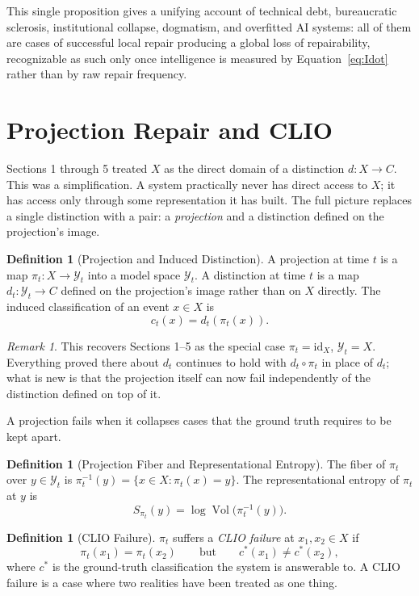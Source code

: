 \documentclass[11pt]{article}
\theoremstyle{plain}
\theoremstyle{definition}
\newtheorem{definition}[theorem]{Definition}
\theoremstyle{remark}
\newtheorem{remark}[theorem]{Remark}
\begin{document}
This single proposition gives a unifying account of technical debt, bureaucratic sclerosis, institutional collapse, dogmatism, and overfitted AI systems: all of them are cases of successful local repair producing a global loss of repairability, recognizable as such only once intelligence is measured by Equation~\eqref{eq:Idot} rather than by raw repair frequency.

\section{Projection Repair and CLIO}
\label{sec:clio}

Sections 1 through 5 treated $X$ as the direct domain of a distinction $d : X \to C$. This was a simplification. A system practically never has direct access to $X$; it has access only through some representation it has built. The full picture replaces a single distinction with a pair: a \emph{projection} and a distinction defined on the projection's image.

\begin{definition}[Projection and Induced Distinction]
A projection at time $t$ is a map $\pi_t : X \to \mathcal{Y}_t$ into a model space $\mathcal{Y}_t$. A distinction at time $t$ is a map $d_t : \mathcal{Y}_t \to C$ defined on the projection's image rather than on $X$ directly. The induced classification of an event $x \in X$ is
\[
c_t(x) = d_t(\pi_t(x)).
\]
\end{definition}

\begin{remark}
This recovers Sections 1--5 as the special case $\pi_t = \mathrm{id}_X$, $\mathcal{Y}_t = X$. Everything proved there about $d_t$ continues to hold with $d_t \circ \pi_t$ in place of $d_t$; what is new is that the projection itself can now fail independently of the distinction defined on top of it.
\end{remark}

A projection fails when it collapses cases that the ground truth requires to be kept apart.

\begin{definition}[Projection Fiber and Representational Entropy]
The fiber of $\pi_t$ over $y \in \mathcal{Y}_t$ is $\pi_t^{-1}(y) = \{x \in X : \pi_t(x) = y\}$. The representational entropy of $\pi_t$ at $y$ is
\[
S_{\pi_t}(y) = \log \operatorname{Vol}\big(\pi_t^{-1}(y)\big).
\]
\end{definition}

\begin{definition}[CLIO Failure]
$\pi_t$ suffers a \emph{CLIO failure} at $x_1, x_2 \in X$ if
\[
\pi_t(x_1) = \pi_t(x_2) \qquad \text{but} \qquad c^\ast(x_1) \ne c^\ast(x_2),
\]
where $c^\ast$ is the ground-truth classification the system is answerable to. A CLIO failure is a case where two realities have been treated as one thing.
\end{definition}
\end{document}
